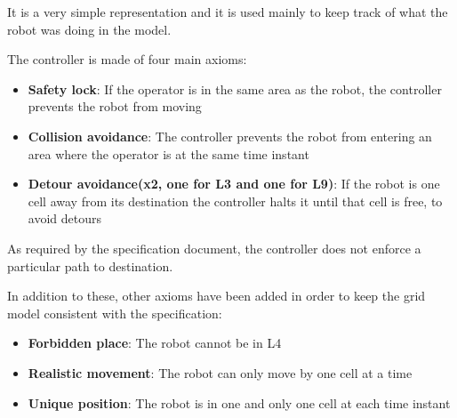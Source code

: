 It is a very simple representation and it is used mainly to keep track of what the robot was doing in the model.

The controller is made of four main axioms:
\begin{itemize}
	\item \textbf{Safety lock}: If the operator is in the same area as the robot, the controller prevents the robot from moving
	
	\item \textbf{Collision avoidance}: The controller prevents the robot from entering an area where the operator is at the same time instant
	
	\item \textbf{Detour avoidance(x2, one for L3 and one for L9)}: If the robot is one cell away from its destination the controller halts it until that cell is free, to avoid detours
\end{itemize}

As required by the specification document, the controller does not enforce a particular path to destination.

In addition to these, other axioms have been added in order to keep the grid model consistent with the specification:


\begin{itemize}
	\item \textbf{Forbidden place}: The robot cannot be in L4
	
	\item \textbf{Realistic movement}: The robot can only move by one cell at a time
	
	\item \textbf{Unique position}: The robot is in one and only one cell at each time instant
\end{itemize}